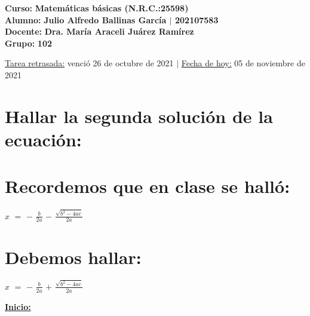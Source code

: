 \documentclass[12pt]{article}
\newenvironment{MyColorPar}[1]{%
    \leavevmode\color{#1}\ignorespaces%
}{%
}%
\begin{document}
    \large{\bf{\textsf{Curso:}}} {\bfseries{{\textcolor{brightturquoise}{Matemáticas básicas \bfseries{(N.R.C.:25598)}}}}} \\
    \large{\bf{\textsf{Alumno:}}} {\bfseries{{\textcolor{prussianblue}{Julio Alfredo Ballinas García {\large{{$\mid$}}} 202107583}}}}  \\
    \large{\bf{\textsf{Docente:}}} {\bfseries{{\textcolor{wisteria}{Dra. María Araceli Juárez Ramírez}}}}\\
    \large{\bf{\textsf{Grupo:}}} {\bfseries{{\textcolor{verde_manzana}{102}}}}\\

\vfill
    
\begin{center} 

    {\small{\textsf{\underline{Tarea retrasada:} venció 26 de octubre de 2021 {}} {\LARGE{ $\mid$ }}\textsf{{\underline{Fecha de hoy:}} 05 de noviembre de 2021}}}

\end{center}

\newpage

\section*{\textsf{Hallar la segunda solución de la ecuación:}}


\section*{\textsf{Recordemos que en clase se halló:}}

\hspace{4cm} $x$ $=$ {\LARGE{$-$ $\frac{b}{2a}$ $-$ $\frac{\sqrt{b^{2}-4ac}}{2a}$}} 
\vspace{0.5cm}

\section*{\textsf{Debemos hallar:}}

\hspace{4cm} $x$ $=$ {\LARGE{$-$ $\frac{b}{2a}$ $+$ $\frac{\sqrt{b^{2}-4ac}}{2a}$}} \vspace{0.5cm}

\begin{MyColorPar}{Cinnabar}
\bfseries{\underline{Inicio:}}
\end{MyColorPar} \vspace{0.5cm}
\end{document}
